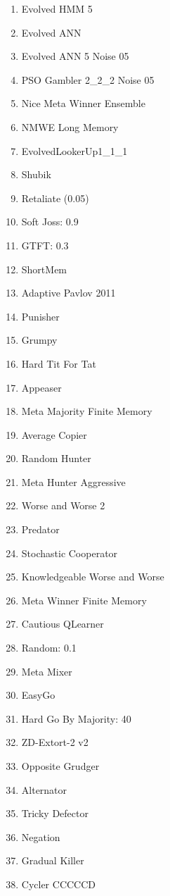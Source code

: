 \begin{multicols}{3}
\begin{enumerate}
  \item Evolved HMM 5
  \item Evolved ANN
  \item Evolved ANN 5 Noise 05
  \item PSO Gambler 2\_2\_2 Noise 05
  \item Nice Meta Winner Ensemble
  \item NMWE Long Memory
  \item EvolvedLookerUp1\_1\_1
  \item Shubik
  \item Retaliate (0.05)
  \item Soft Joss: 0.9
  \item GTFT: 0.3
  \item ShortMem
  \item Adaptive Pavlov 2011
  \item Punisher
  \item Grumpy
  \item Hard Tit For Tat
  \item Appeaser
  \item Meta Majority Finite Memory
  \item Average Copier
  \item Random Hunter
  \item Meta Hunter Aggressive
  \item Worse and Worse 2
  \item Predator
  \item Stochastic Cooperator
  \item Knowledgeable Worse and Worse
  \item Meta Winner Finite Memory
  \item Cautious QLearner
  \item Random: 0.1
  \item Meta Mixer
  \item EasyGo
  \item Hard Go By Majority: 40
  \item ZD-Extort-2 v2
  \item Opposite Grudger
  \item Alternator
  \item Tricky Defector
  \item Negation
  \item Gradual Killer
  \item Cycler CCCCCD
\end{enumerate}
\end{multicols}


